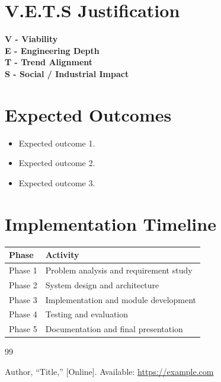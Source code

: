 \documentclass[12pt,a4paper]{report}
\begin{document}
\section{V.E.T.S Justification}

\vspace{0.3cm}
\noindent \textbf{V - Viability}\\

\vspace{0.5cm}
\noindent \textbf{E - Engineering Depth}\\

\vspace{0.5cm}
\noindent \textbf{T - Trend Alignment}\\

\vspace{0.5cm}
\noindent \textbf{S - Social / Industrial Impact}\\

\section{Expected Outcomes}
\begin{itemize}
\item Expected outcome 1.
\item Expected outcome 2.
\item Expected outcome 3.
\end{itemize}

\section{Implementation Timeline}
\begin{table}[H]
\centering
\begin{tabular}{|p{2cm}|p{12.5cm}|}
\toprule
\textbf{Phase} & \textbf{Activity} \\
\midrule
Phase 1 & Problem analysis and requirement study \\
\midrule
Phase 2 & System design and architecture \\
\midrule
Phase 3 & Implementation and module development \\
\midrule
Phase 4 & Testing and evaluation \\
\midrule
Phase 5 & Documentation and final presentation \\
\bottomrule
\end{tabular}
\end{table}

\renewcommand{\bibname}{\centering \normalfont\Large\bfseries 9. References}
\begin{thebibliography}{99}

Author, ``Title,'' [Online]. Available: \url{https://example.com}

\end{thebibliography}
\end{document}
